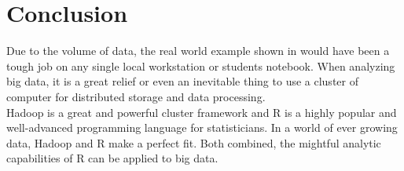 \chapter{Conclusion}\label{chap:conclusion}
Due to the volume of data, the real world example shown in  would have been a tough job on any single local workstation or students notebook. When analyzing big data, it is a great relief or even an inevitable thing to use a cluster of computer for distributed storage and data processing.\\

Hadoop is a great and powerful cluster framework and R is a highly popular and well-advanced programming language for statisticians. In a world of ever growing data, Hadoop and R make a perfect fit. Both combined, the mightful analytic capabilities of R can be applied to big data.



